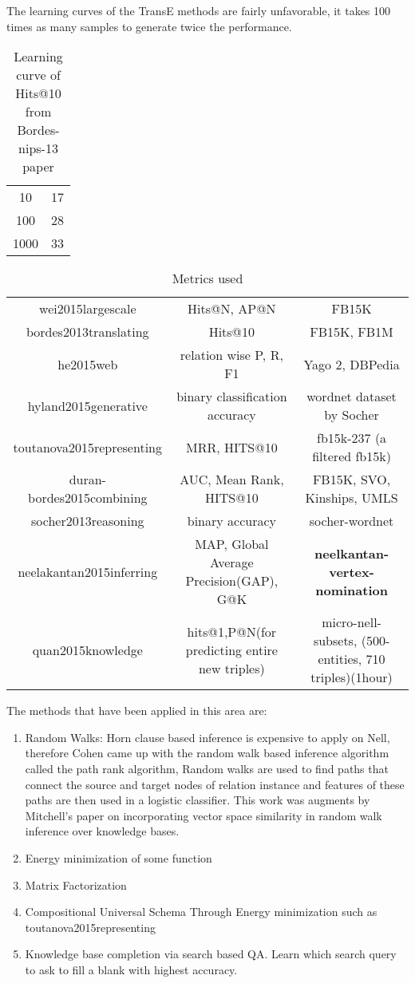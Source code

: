 \documentclass{article}
\begin{document}
The learning curves of the TransE methods are fairly unfavorable,
it takes 100 times as many samples to generate twice the performance.
\begin{table}[htbp]
  \centering
  \begin{tabular}{c c}
    10 &  17\\
    100&  28\\
    1000& 33
  \end{tabular}
  \caption{Learning curve of Hits@10 from Bordes-nips-13 paper}
  \label{tab:lrcurve-bordes2013nips}
\end{table}



\begin{table}[htbp]
  \centering
  \begin{adjustwidth}{-4cm}{}
  \begin{tabular}{c c c }
    wei2015largescale & Hits@N, AP@N & FB15K \\
    bordes2013translating & Hits@10 & FB15K, FB1M \\
    he2015web & relation wise P, R, F1 & Yago 2, DBPedia \\
    hyland2015generative & binary classification accuracy  & wordnet dataset by Socher \\
    toutanova2015representing & MRR, HITS@10 & fb15k-237 (a filtered fb15k)\\
    duran-bordes2015combining & AUC, Mean Rank, HITS@10 & FB15K, SVO, Kinships, UMLS \\
    socher2013reasoning & binary accuracy & socher-wordnet \\
    neelakantan2015inferring & MAP, Global Average Precision(GAP), G@K & \textbf{neelkantan-vertex-nomination} \\
    quan2015knowledge & hits@1,P@N(for predicting entire new triples) & micro-nell-subsets, (500-entities, 710 triples)(1hour)
  \end{tabular}
  \end{adjustwidth}
  \caption{Metrics used}
  \label{tab:metrics}
\end{table}


The methods that have been applied in this area are:
\begin{enumerate}
\item Random Walks: Horn clause based inference is expensive to apply on Nell, therefore
  Cohen came up with the random walk based inference algorithm called the
  path rank algorithm, Random walks are used to find paths that connect the source and target
  nodes of relation instance and features of these paths are then used
  in a logistic classifier. This work was augments by Mitchell's paper on
  incorporating vector space similarity in random walk inference over knowledge bases.
\item Energy minimization of some function
\item Matrix Factorization
\item Compositional Universal Schema Through Energy minimization such as toutanova2015representing
\item Knowledge base completion via search based QA. Learn which search query to ask to fill a blank with highest accuracy.
\end{enumerate}
\end{document}
